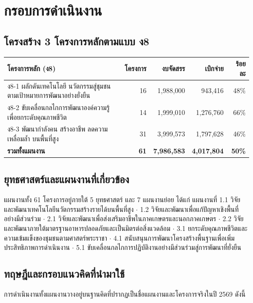 \documentclass[12pt,a4paper]{article}
\begin{document}
\section{กรอบการดำเนินงาน}
\subsection{โครงสร้าง 3 โครงการหลักตามแบบ ง8}

\begin{center}\small
\setlength{\tabcolsep}{5pt}\renewcommand{\arraystretch}{1.35}
\begin{tabular}{p{6.6cm}rrrr}
\toprule
\rowcolor{rpfnavy!12}
\textbf{โครงการหลัก (ง8)} & \textbf{โครงการ} & \textbf{งบจัดสรร} & \textbf{เบิกจ่าย} & \textbf{ร้อยละ}\\
\midrule
ง8-1 ผลักดันเทคโนโลยี นวัตกรรมสู่ชุมชน ตามเป้าหมายการพัฒนาอย่างยั่งยืน & 16 & 1,988,000 & 943,416 & 48\%\\
ง8-2 ขับเคลื่อนกลไกการพัฒนาองค์ความรู้เพื่อยกระดับคุณภาพชีวิต & 14 & 1,999,010 & 1,276,760 & 66\%\\
ง8-3 พัฒนากำลังคน สร้างอาชีพ ลดความเหลื่อมล้ำ บนพื้นที่สูง & 31 & 3,999,573 & 1,797,628 & 46\%\\
\midrule
\rowcolor{rpfgold!15}
\textbf{รวมทั้งแผนงาน} & \textbf{61} & \textbf{7,986,583} & \textbf{4,017,804} & \textbf{50\%}\\
\bottomrule
\end{tabular}
\end{center}

\subsection{ยุทธศาสตร์และแผนงานที่เกี่ยวข้อง}
แผนงานทั้ง 61 โครงการอยู่ภายใต้ 5 ยุทธศาสตร์ และ 7 แผนงานย่อย ได้แก่
แผนงานที่ 1.1 วิจัยและพัฒนาเทคโนโลยีนวัตกรรมสร้างรายได้บนพื้นที่สูง $\cdot$
1.2 วิจัยและพัฒนาเพื่อแก้ปัญหาเชิงพื้นที่อย่างมีส่วนร่วม $\cdot$
2.1 วิจัยและพัฒนาเพื่อส่งเสริมอาชีพในภาคเกษตรและนอกภาคเกษตร $\cdot$
2.2 วิจัยและพัฒนาภายใต้มาตรฐานอาหารปลอดภัยและเป็นมิตรต่อสิ่งแวดล้อม $\cdot$
3.1 ยกระดับคุณภาพชีวิตและความเข้มแข็งของชุมชนตามศาสตร์พระราชา $\cdot$
4.1 สนับสนุนการพัฒนาโครงสร้างพื้นฐานเพื่อเพิ่มประสิทธิภาพการดำเนินงาน $\cdot$
5.1 ขับเคลื่อนกลไกการปฏิบัติงานอย่างมีส่วนร่วมสู่การพัฒนาที่ยั่งยืน

\subsection{ทฤษฎีและกรอบแนวคิดที่นำมาใช้}
การดำเนินงานทั้งแผนงานวางอยู่บนฐานคิดที่ปรากฏเป็นชื่อแผนงานและโครงการจริงในปี 2569 ดังนี้
\end{document}

